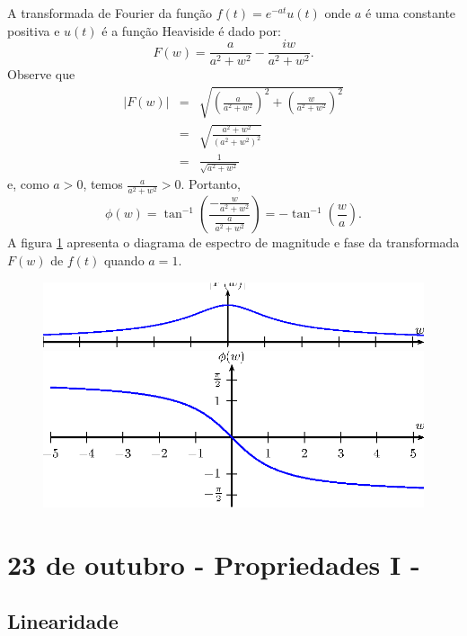 \documentclass[a4paper,10pt]{book}
\begin{document}
A transformada de Fourier da função $f(t)=e^{-at}u(t)$ onde $a$ é uma constante positiva e $u(t)$ é a função Heaviside é dado por: 
 \begin{equation*}
 F(w)=\frac{a}{a^2+w^2}-\frac{iw}{a^2+w^2}.
 \end{equation*}
 Observe que
 \begin{eqnarray*}
 |F(w)|&=&\sqrt{\left(\frac{a}{a^2+w^2}\right)^2+\left(\frac{w}{a^2+w^2}\right)^2}\\
 &=&\sqrt{\frac{a^2+w^2}{\left(a^2+w^2\right)^2}}\\&=&\frac{1}{\sqrt{a^2+w^2}}
 \end{eqnarray*}
 e, como $a>0$, temos $\frac{a}{a^2+w^2}>0$. Portanto,
 \begin{equation}
 \phi(w)=\tan^{-1}\left(\frac{-\frac{w}{a^2+w^2}}{\frac{a}{a^2+w^2}}\right)=-\tan^{-1}\left(\frac{w}{a}\right).
 \end{equation}
 A figura \ref{diag_espec_trans_2} apresenta o diagrama de espectro de magnitude e fase da transformada $F(w)$ de $f(t)$ quando $a=1$.
  \begin{figure}[!ht]
  \begin{center}
  \includegraphics{figs/cap_diagramas_espectro_transformada_figura_2}
  \includegraphics{figs/cap_diagramas_espectro_transformada_figura_3}\end{center}
  \caption{\label{diag_espec_trans_2}}
  \end{figure}

  
  \chapter{23 de outubro - Propriedades I - }
    
  \section{Linearidade}
  
\end{document}
